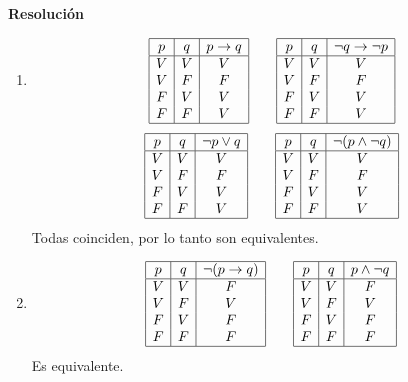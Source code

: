 \documentclass[11pt]{article}
\begin{document}
\textbf{Resolución}
\begin{enumerate}[label=\roman*)]
   \item
\[
\begin{array}{|c|c|c|}
\hline
p & q & p \rightarrow q \\
\hline
V & V & V \\
V & F & F \\
F & V & V \\
F & F & V \\
\hline
\end{array}
\qquad
\begin{array}{|c|c|c|}
\hline
p & q & \neg q \rightarrow \neg p \\
\hline
V & V & V \\
V & F & F \\
F & V & V \\
F & F & V \\
\hline
\end{array}
\]
\[
\begin{array}{|c|c|c|}
\hline
p & q & \neg p \lor q \\
\hline
V & V & V \\
V & F & F \\
F & V & V \\
F & F & V \\
\hline
\end{array}
\qquad
\begin{array}{|c|c|c|}
\hline
p & q & \neg (p \land \neg q) \\
\hline
V & V & V \\
V & F & F \\
F & V & V \\
F & F & V \\
\hline
\end{array}
\]
Todas coinciden, por lo tanto son equivalentes.

\item 
\[
\begin{array}{|c|c|c|}
    \hline
    p & q & \neg(p \rightarrow q) \\
    \hline
    V & V & F \\
    V & F & V \\
    F & V & F \\
    F & F & F \\
    \hline
\end{array}
\qquad
\begin{array}{|c|c|c|}
    \hline
    p & q & p \land \neg q \\
    \hline
    V & V & F \\
    V & F & V \\
    F & V & F \\
    F & F & F \\
    \hline
\end{array}
\]
Es equivalente.
\end{enumerate}
\end{document}
